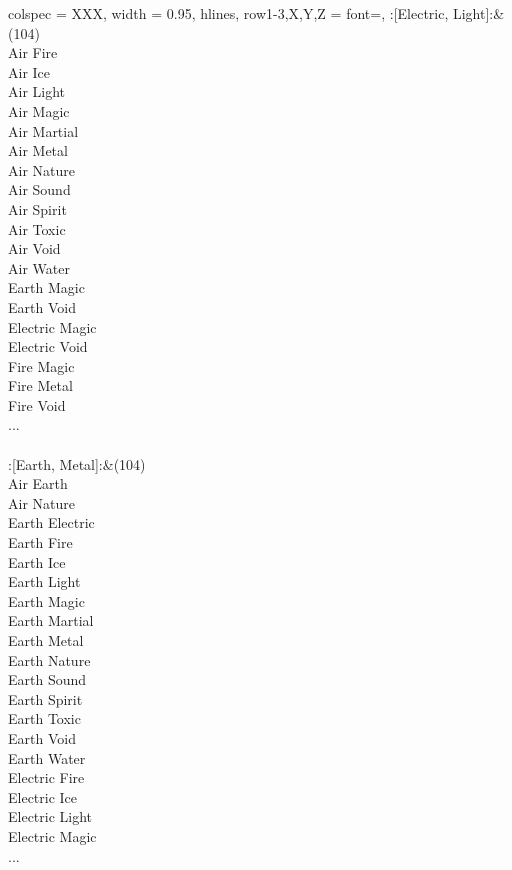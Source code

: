\begin{longtblr}[
	caption = {2v2 Defending Weak},
	label = {2v2-Defending-Weak},
]{
	colspec = {XXX}, width = 0.95\linewidth,
	hlines,
	row{1-3,X,Y,Z} = {font=\bfseries},
}
	:[Electric, Light]:&{(104)\\
	Air Fire \\
	Air Ice \\
	Air Light \\
	Air Magic \\
	Air Martial \\
	Air Metal \\
	Air Nature \\
	Air Sound \\
	Air Spirit \\
	Air Toxic \\
	Air Void \\
	Air Water \\
	Earth Magic \\
	Earth Void \\
	Electric Magic \\
	Electric Void \\
	Fire Magic \\
	Fire Metal \\
	Fire Void \\
	...\\
	}\\

	:[Earth, Metal]:&{(104)\\
	Air Earth \\
	Air Nature \\
	Earth Electric \\
	Earth Fire \\
	Earth Ice \\
	Earth Light \\
	Earth Magic \\
	Earth Martial \\
	Earth Metal \\
	Earth Nature \\
	Earth Sound \\
	Earth Spirit \\
	Earth Toxic \\
	Earth Void \\
	Earth Water \\
	Electric Fire \\
	Electric Ice \\
	Electric Light \\
	Electric Magic \\
	...\\
	}\\


\end{longtblr}

